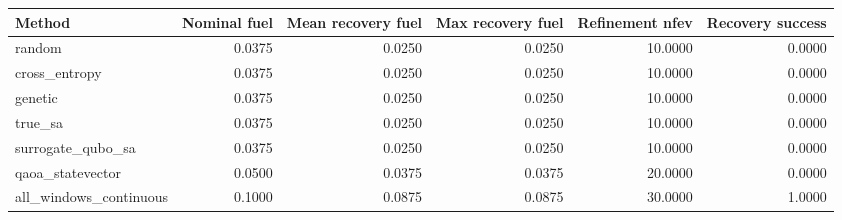 \begin{tabular}{lrrrrr}
\toprule
Method & Nominal fuel & Mean recovery fuel & Max recovery fuel & Refinement nfev & Recovery success \\
\midrule
random & 0.0375 & 0.0250 & 0.0250 & 10.0000 & 0.0000 \\
cross\_entropy & 0.0375 & 0.0250 & 0.0250 & 10.0000 & 0.0000 \\
genetic & 0.0375 & 0.0250 & 0.0250 & 10.0000 & 0.0000 \\
true\_sa & 0.0375 & 0.0250 & 0.0250 & 10.0000 & 0.0000 \\
surrogate\_qubo\_sa & 0.0375 & 0.0250 & 0.0250 & 10.0000 & 0.0000 \\
qaoa\_statevector & 0.0500 & 0.0375 & 0.0375 & 20.0000 & 0.0000 \\
all\_windows\_continuous & 0.1000 & 0.0875 & 0.0875 & 30.0000 & 1.0000 \\
\bottomrule
\end{tabular}

